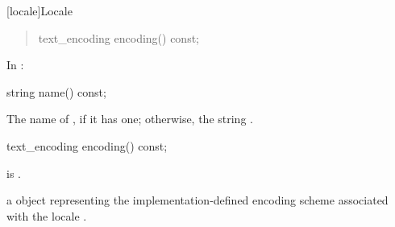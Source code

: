 \documentclass{wg21}
\begin{document}
[locale]{Locale}

\begin{quote}
\begin{codeblock}
namespace std {
  class locale {
  public:
    [...]

    // locale operations
    string name() const;
\end{codeblock}
\begin{addedblock}
\begin{codeblock}
    text_encoding encoding() const;
\end{codeblock}
\end{addedblock}
\begin{codeblock}
  };
}
\end{codeblock}
\end{quote}

In :

\begin{itemdecl}
string name() const;
\end{itemdecl}

\begin{itemdescr}
\pnum
\returns
The name of
,
if it has one; otherwise, the string .
\end{itemdescr}

\begin{addedblock}
\begin{itemdecl}
text_encoding encoding() const;
\end{itemdecl}

\begin{itemdescr}

\mandates {} is .

\returns a  object representing the implementation-defined encoding scheme associated with the locale .

\end{itemdescr}

%
%
%
%
\end{addedblock}
\end{document}
